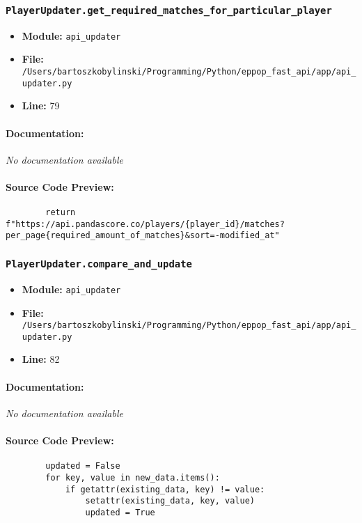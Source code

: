 \documentclass[11pt,a4paper]{article}
\begin{document}
\vspace{1em}
\subsubsection{\texttt{PlayerUpdater.get\_required\_matches\_for\_particular\_player}}

\begin{itemize}
    \item \textbf{Module:} \texttt{api\_updater}
    \item \textbf{File:} \texttt{/Users/bartoszkobylinski/Programming/Python/eppop\_fast\_api/app/api\_updater.py}
    \item \textbf{Line:} 79
\end{itemize}

\paragraph{Documentation:} \textit{No documentation available}

\paragraph{Source Code Preview:}
\begin{verbatim}
        return f"https://api.pandascore.co/players/{player_id}/matches?per_page{required_amount_of_matches}&sort=-modified_at"
\end{verbatim}

\vspace{1em}
\subsubsection{\texttt{PlayerUpdater.compare\_and\_update}}

\begin{itemize}
    \item \textbf{Module:} \texttt{api\_updater}
    \item \textbf{File:} \texttt{/Users/bartoszkobylinski/Programming/Python/eppop\_fast\_api/app/api\_updater.py}
    \item \textbf{Line:} 82
\end{itemize}

\paragraph{Documentation:} \textit{No documentation available}

\paragraph{Source Code Preview:}
\begin{verbatim}
        updated = False
        for key, value in new_data.items():
            if getattr(existing_data, key) != value:
                setattr(existing_data, key, value)
                updated = True
\end{verbatim}
\end{document}

